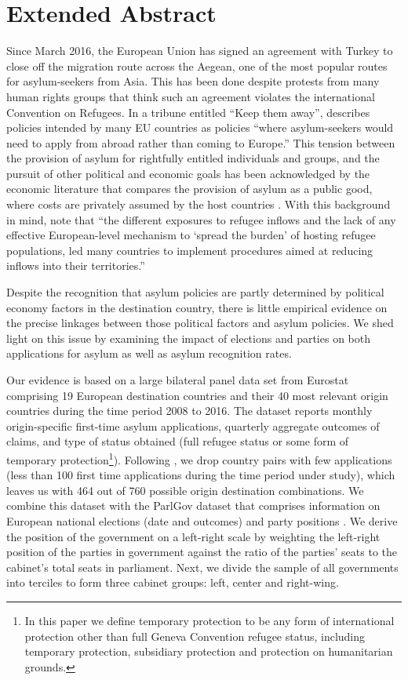 \documentclass[a4paper,12pt]{article}
\begin{document}
\section{Extended Abstract}\label{extended_abstract}
Since March 2016, the European Union has signed an agreement with Turkey to close off the migration route across the Aegean, one of the most popular routes for asylum-seekers from Asia. This has been done despite protests from many human rights groups that think such an agreement violates the international Convention on Refugees. In a tribune entitled ``Keep them away'', \textit{\cite{Economist2017}} describes policies intended by many EU countries as policies ``where asylum-seekers would need to apply from abroad rather than coming to Europe.'' This tension between the provision of asylum for rightfully entitled individuals and groups, and the pursuit of other political and economic goals has been acknowledged by the economic literature that compares the provision of asylum as a public good, where costs are privately assumed by the host countries \citep{moraga2014}. With this background in mind, \cite{dustmann2016} note that ``the  different  exposures  to  refugee  inflows and  the  lack  of  any  effective  European-level  mechanism  to  `spread  the  burden'  of  hosting  refugee  populations,  led  many  countries  to  implement  procedures  aimed  at  reducing  inflows  into  their  territories.''

Despite the recognition that asylum policies are partly determined by political economy factors in the destination country, there is little empirical evidence on the precise linkages between those political factors and asylum policies. We shed light on this issue by examining the impact of elections and parties on both applications for asylum as well as asylum recognition rates. 

Our evidence is based on a large bilateral panel data set from Eurostat comprising 19 European destination countries and their 40 most relevant origin countries during the time period 2008 to 2016. The dataset reports monthly origin-specific first-time asylum applications, quarterly aggregate outcomes of claims, and type of status obtained (full refugee status or some form of temporary protection\footnote{In this paper we define temporary protection to be any form of international protection other than full Geneva Convention refugee status, including temporary protection, subsidiary protection and protection on humanitarian grounds. }). Following \cite{hatton2016}, we drop country pairs with few applications (less than 100 first time applications during the time period under study), which leaves us with 464 out of 760 possible origin destination combinations. We combine this dataset with the ParlGov dataset that comprises information on European national elections (date and outcomes) and party positions \citep{parlgov2016}. We derive the position of the government on a left-right scale by weighting the left-right position of the parties in government  against the ratio of the parties' seats to the cabinet's total seats in parliament.  Next, we divide the sample of all governments into terciles  to form three cabinet groups: left, center and right-wing.
\end{document}
